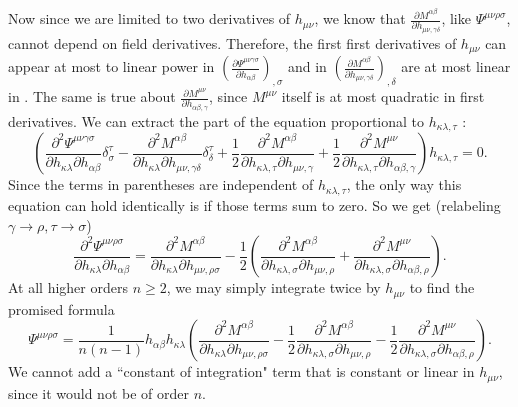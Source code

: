 \documentclass[aps,physrev,preprint,groupedaddress]{revtex4-2}
\begin{document}
Now since we are limited to two derivatives of \(h_{\mu\nu}\), we know that \(\frac{\partial M^{\alpha\beta}}{\partial h_{\mu\nu,\gamma\delta}}\), like \(\Psi^{\mu\nu\rho\sigma}\), cannot depend on field derivatives. Therefore, the first first derivatives of \(h_{\mu\nu}\) can appear at most to linear power in \({\left(\frac{\partial \Psi^{\mu\nu\gamma\sigma}}{\partial h_{\alpha\beta}}\right)}_{,\sigma}\) and in \({\left(\frac{\partial M^{\alpha\beta}}{\partial h_{\mu\nu,\gamma\delta}}\right)}_{,\delta}\) are at most linear in . The same is true about \(\frac{\partial M^{\mu\nu}}{\partial h_{\alpha\beta,\gamma}}\), since \(M^{\mu\nu}\) itself is at most quadratic in first derivatives. We can extract the part of the equation proportional to \(h_{\kappa\lambda,\tau}\) :
\begin{equation}\label{1stdivpart}
    \left(\frac{\partial^2 \Psi^{\mu\nu\gamma\sigma}}{\partial h_{\kappa\lambda}\partial h_{\alpha\beta}}\delta_\sigma^\tau-\frac{\partial^2 M^{\alpha\beta}}{\partial h_{\kappa\lambda}\partial h_{\mu\nu,\gamma\delta}}\delta_\delta^\tau+\frac{1}{2}\frac{\partial^2 M^{\alpha\beta}}{\partial h_{\kappa\lambda,\tau}\partial h_{\mu\nu,\gamma}}+\frac{1}{2}\frac{\partial^2 M^{\mu\nu}}{\partial h_{\kappa\lambda,\tau}\partial h_{\alpha\beta,\gamma}}\right)h_{\kappa\lambda,\tau}=0.
\end{equation}
Since the terms in parentheses are independent of \(h_{\kappa\lambda,\tau}\), the only way this equation can hold identically is if those terms sum to zero. So we get (relabeling \(\gamma\rightarrow\rho,\tau\rightarrow\sigma\))
\begin{equation} \label{ddPsidhdh}
    \frac{\partial^2 \Psi^{\mu\nu\rho\sigma}}{\partial h_{\kappa\lambda}\partial h_{\alpha\beta}}=\frac{\partial^2 M^{\alpha\beta}}{\partial h_{\kappa\lambda}\partial h_{\mu\nu,\rho\sigma}}-\frac{1}{2}\left(\frac{\partial^2 M^{\alpha\beta}}{\partial h_{\kappa\lambda,\sigma}\partial h_{\mu\nu,\rho}}+\frac{\partial^2 M^{\mu\nu}}{\partial h_{\kappa\lambda,\sigma}\partial h_{\alpha\beta,\rho}}\right).
\end{equation}
At all higher orders \(n\ge 2\), we may simply integrate twice by \(h_{\mu\nu}\) to find the promised formula
\begin{equation}\label{PsiForm}
     \Psi^{\mu\nu\rho\sigma}=\frac{1}{n(n-1)}h_{\alpha\beta}h_{\kappa\lambda}\left(\frac{\partial^2 M^{\alpha\beta}}{\partial h_{\kappa\lambda}\partial h_{\mu\nu,\rho\sigma}}-\frac{1}{2}\frac{\partial^2 M^{\alpha\beta}}{\partial h_{\kappa\lambda,\sigma}\partial h_{\mu\nu,\rho}}-\frac{1}{2}\frac{\partial^2 M^{\mu\nu}}{\partial h_{\kappa\lambda,\sigma}\partial h_{\alpha\beta,\rho}}\right).
\end{equation}
We cannot add a ``constant of integration" term that is constant or linear in \(h_{\mu\nu}\), since it would not be of order \(n\). 
\end{document}
